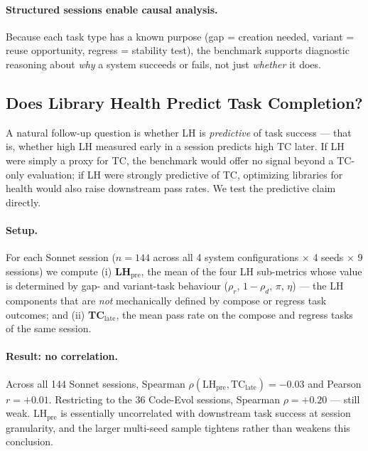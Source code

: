 \documentclass[sigconf,anonymous,review,natbib=false]{acmart}
\begin{document}
\paragraph{Structured sessions enable causal analysis.} Because each task type has a known purpose (gap = creation needed, variant = reuse opportunity, regress = stability test), the benchmark supports diagnostic reasoning about \emph{why} a system succeeds or fails, not just \emph{whether} it does.

\subsection{Does Library Health Predict Task Completion?}
\label{sec:predictive_validity}

A natural follow-up question is whether LH is \emph{predictive} of task success --- that is, whether high LH measured early in a session predicts high TC later. If LH were simply a proxy for TC, the benchmark would offer no signal beyond a TC-only evaluation; if LH were strongly predictive of TC, optimizing libraries for health would also raise downstream pass rates. We test the predictive claim directly.

\paragraph{Setup.} For each Sonnet session ($n = 144$ across all 4 system configurations $\times$ 4 seeds $\times$ 9 sessions) we compute (i) \textbf{LH$_\text{pre}$}, the mean of the four LH sub-metrics whose value is determined by gap- and variant-task behaviour ($\rho_r$, $1-\rho_d$, $\pi$, $\eta$) --- the LH components that are \emph{not} mechanically defined by compose or regress task outcomes; and (ii) \textbf{TC$_\text{late}$}, the mean pass rate on the compose and regress tasks of the same session.

\paragraph{Result: no correlation.} Across all 144 Sonnet sessions, Spearman $\rho(\text{LH}_\text{pre}, \text{TC}_\text{late}) = -0.03$ and Pearson $r = +0.01$. Restricting to the 36 Code-Evol sessions, Spearman $\rho = +0.20$ --- still weak. LH$_\text{pre}$ is essentially uncorrelated with downstream task success at session granularity, and the larger multi-seed sample tightens rather than weakens this conclusion.
\end{document}
